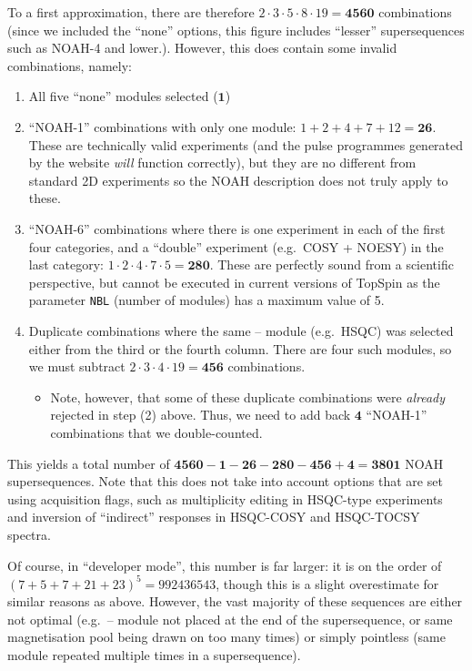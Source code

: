\documentclass[a4paper,11pt]{article}
\newcommand{\proton}{\ce{^{1}H}}
\newcommand{\carbon}{\ce{^{13}C}}
\newcommand{\CH}{\carbon{}--\proton{}}
\newcommand{\HH}{\proton{}--\proton{}}
\begin{document}
To a first approximation, there are therefore \(2 \cdot 3 \cdot 5 \cdot 8 \cdot 19 = \mathbf{4560}\) combinations (since we included the ``none'' options, this figure includes ``lesser'' supersequences such as NOAH-4 and lower.).
However, this does contain some invalid combinations, namely:
\begin{enumerate}
    \item All five ``none'' modules selected (\(\mathbf{1}\))
    \item ``NOAH-1'' combinations with only one module: \(1 + 2 + 4 + 7 + 12 = \mathbf{26}\).
        These are technically valid experiments (and the pulse programmes generated by the website \textit{will} function correctly), but they are no different from standard 2D experiments so the NOAH description does not truly apply to these.
    \item ``NOAH-6'' combinations where there is one experiment in each of the first four categories, and a ``double'' experiment (e.g.\ COSY + NOESY) in the last category: \(1 \cdot 2 \cdot 4 \cdot 7 \cdot 5 = \mathbf{280}\).
        These are perfectly sound from a scientific perspective, but cannot be executed in current versions of TopSpin as the parameter \texttt{NBL} (number of modules) has a maximum value of 5.
    \item Duplicate combinations where the same \CH{} module (e.g.\ HSQC) was selected either from the third or the fourth column.
        There are four such modules, so we must subtract \(2 \cdot 3 \cdot 4 \cdot 19 = \mathbf{456}\) combinations.
        \begin{itemize}
            \item Note, however, that some of these duplicate combinations were \textit{already} rejected in step (2) above. Thus, we need to add back \(\mathbf{4}\) ``NOAH-1'' combinations that we double-counted.
        \end{itemize}
\end{enumerate}

This yields a total number of \(\mathbf{4560 - 1 - 26 - 280 - 456 + 4 = 3801}\) NOAH supersequences.
Note that this does not take into account options that are set using acquisition flags, such as multiplicity editing in HSQC-type experiments and inversion of ``indirect'' responses in HSQC-COSY and HSQC-TOCSY spectra.

Of course, in ``developer mode'', this number is far larger: it is on the order of \((7 + 5 + 7 + 21 + 23)^5 = \num{992436543}\), though this is a slight overestimate for similar reasons as above.
However, the vast majority of these sequences are either not optimal (e.g.\ \HH{} module not placed at the end of the supersequence, or same magnetisation pool being drawn on too many times) or simply pointless (same module repeated multiple times in a supersequence).
\end{document}

